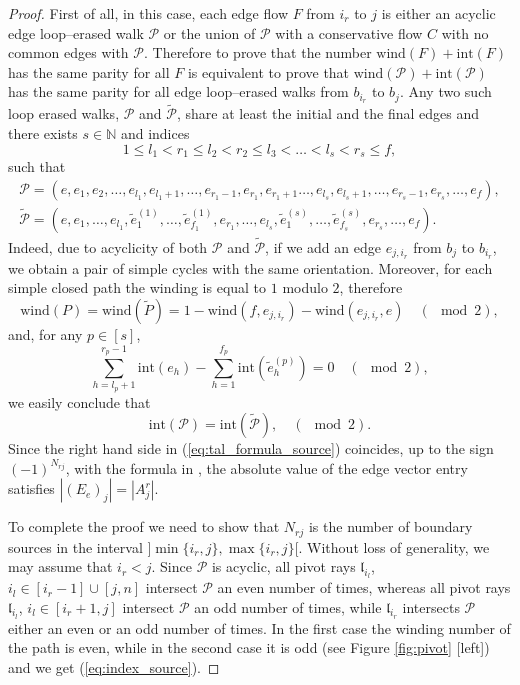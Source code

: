 \documentclass[11pt]{amsart}
\theoremstyle{plain}
\numberwithin{equation}{section}
\begin{document}
\begin{proof}
First of all, in this case, each edge flow $F$ from $i_r$ to $j$ is either an acyclic edge loop--erased walk $\mathcal P$ or the union of $\mathcal P$ with a conservative flow $C$ with no common edges with $\mathcal P$. Therefore to prove that the number $\mbox{wind}(F)+\mbox{int}(F)$ has the same parity for all $F$ is equivalent to prove that $\mbox{wind}(\mathcal P)+\mbox{int}(\mathcal P)$ has the same parity for all edge loop--erased walks from $b_{i_r}$ to $b_j$. 
Any two such loop erased walks, ${\mathcal P}$ and ${\tilde {\mathcal P}}$, share at least the initial and the final edges and there exists $s\in \mathbb{N}$ and indices
\[
1\le l_1< r_1\le l_2 < r_2\le l_3 < \dots < l_s < r_s \le f,
\]
such that
\[
\begin{array}{c}
{\mathcal P} = (e, e_1,e_2, \dots, e_{l_1}, e_{l_1+1}, \dots, e_{r_1-1}, e_{r_1},e_{r_1+1}\dots, e_{l_s}, e_{l_s+1}, \dots, e_{r_s-1}, e_{r_s}, \dots , e_f),\\
{\tilde {\mathcal P}} = (e, e_1,\dots, e_{l_1}, {\tilde e}^{(1)}_1,\dots, {\tilde e}^{(1)}_{f_1}, e_{r_1}, \dots, e_{l_s}, {\tilde e}^{(s)}_1,\dots, {\tilde e}^{(s)}_{f_s}, e_{r_s}, \dots ,e_f).
\end{array}
\]
Indeed, due to acyclicity of both ${\mathcal P}$ and ${\tilde {\mathcal P}}$, if we add an edge $e_{j,i_r}$ from $b_j$ to $b_{i_r}$, we obtain a pair of simple cycles with the same orientation. Moreover, for each simple closed path the winding is equal to $1$ modulo $2$, therefore 
$$
\mbox{wind} (P) = \mbox{wind} (\tilde P)  = 1 - \mbox{wind}(f,e_{j,i_r}) - \mbox{wind}(e_{j,i_r},e) \quad (\!\!\!\!\!\!\mod 2),
$$
and, for any $p\in [s]$,
\[
\sum_{h=l_p+1}^{r_{p}-1} \mbox{int} (e_h) -\sum_{h=1}^{f_p} \mbox{int} ({\tilde e}^{(p)}_h) = 0 \quad (\!\!\!\!\!\!\mod 2),
\]
we easily conclude that
\[
\mbox{int} ({\mathcal P}) =\mbox{int} ({\tilde {\mathcal P}}), \quad (\!\!\!\!\!\!\mod 2).
\]
Since the right hand side in (\ref{eq:tal_formula_source}) coincides, up to the sign $(-1)^{N_{rj}}$, with the formula in \cite{Tal2}, the absolute value of the edge vector entry satisfies $|\left(E_{e}\right)_{j}|= |A^r_j|$. 

To complete the proof we need to show that $N_{rj}$ is the number of boundary sources in the interval $\big] \min \{ i_r, j\}, \max \{ i_r, j\}
\big[$. Without loss of generality, we may assume that $i_r<j$.
Since $\mathcal P$ is acyclic, all pivot rays ${\mathfrak l}_{i_l}$, $i_l\in [i_r -1] \cup [j, n]$ intersect $\mathcal P$ an even number of times, whereas all pivot rays ${\mathfrak l}_{i_l}$, $i_l\in [i_r +1, j]$ intersect $\mathcal P$ an odd number of times, while 
${\mathfrak l}_{i_r}$ intersects $\mathcal P$ either an even or an odd number of times. In the first case the 
winding number of the path is even, while in the second case it is odd (see Figure \ref{fig:pivot} [left]) and we get 
(\ref{eq:index_source}). 
\end{proof}
\end{document}
